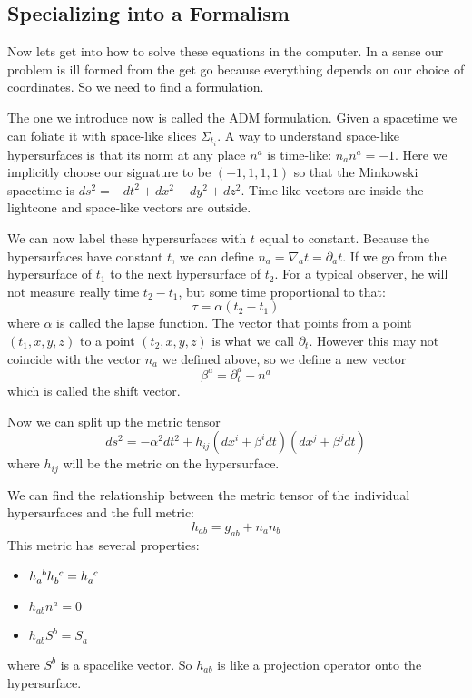 \documentclass[letterpaper, 11pt]{article}
\numberwithin{equation}{section}
\numberwithin{figure}{section}
\begin{document}
\subsection{Specializing into a Formalism}

Now lets get into how to solve these equations in the computer. In a sense our
problem is ill formed from the get go because everything depends on our choice
of coordinates. So we need to find a formulation.

The one we introduce now is called the ADM formulation. Given a spacetime we can
foliate it with space-like slices $\Sigma_{t_i}$. A way to understand space-like
hypersurfaces is that its norm at any place $n^{a}$ is time-like: $n_an^a = -1$.
Here we implicitly choose our signature to be $(-1, 1, 1, 1)$ so that the
Minkowski spacetime is $ds^2 = -dt^2 + dx^2 + dy^2 + dz^2$. Time-like vectors
are inside the lightcone and space-like vectors are outside.

We can now label these hypersurfaces with $t$ equal to constant. Because the
hypersurfaces have constant $t$, we can define $n_{a} = \nabla_at
= \partial_at$. If we go from the hypersurface of $t_{1}$ to the next
hypersurface of $t_2$. For a typical observer, he will not measure really time
$t_2 - t_1$, but some time proportional to that:
\begin{equation}
  \label{eq:16}
  \tau = \alpha(t_2 - t_1)
\end{equation}
where $\alpha$ is called the lapse function. The vector that points from a point
$(t_1, x, y, z)$ to a point $(t_2, x, y, z)$ is what we call $\partial_{t}$.
However this may not coincide with the vector $n_{a}$ we defined above, so we
define a new vector
\begin{equation}
  \label{eq:17}
  \beta^a = \partial_t^a - n^a
\end{equation}
which is called the shift vector.

Now we can split up the metric tensor
\begin{equation}
  \label{eq:18}
  ds^2 = -\alpha^2dt^2 + h_{ij}\left( dx^i + \beta^idt \right)(dx^j + \beta^jdt)
\end{equation}
where $h_{ij}$ will be the metric on the hypersurface.

We can find the relationship between the metric tensor of the individual
hypersurfaces and the full metric:
\begin{equation}
  \label{eq:19}
  h_{ab} = g_{ab} + n_an_{b}
\end{equation}
This metric has several properties:
\begin{itemize}
\item $\tensor{h}{_a^{b}}\tensor{h}{_{b}^{c}} = \tensor{h}{_{a}^{c}}$
    \item $h_{ab}n^a = 0$
    \item $h_{ab}S^{b} = S_{a}$
\end{itemize}
where $S^{b}$ is a spacelike vector. So $h_{ab}$ is like a projection operator
onto the hypersurface.
\end{document}
